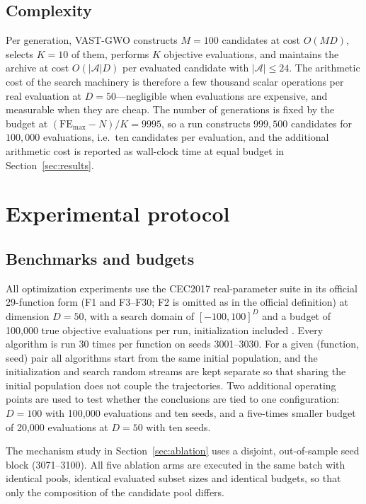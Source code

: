 \documentclass[11pt,a4paper]{article}
\newcommand{\method}{VAST-GWO}
\newcommand{\arc}{\mathcal{A}}
\begin{document}
\subsection{Complexity}
Per generation, \method{} constructs $M=100$ candidates at cost $O(MD)$,
selects $K=10$ of them, performs $K$ objective evaluations, and maintains the
archive at cost $O(|\arc|D)$ per evaluated candidate with $|\arc|\le 24$. The
arithmetic cost of the search machinery is therefore a few thousand scalar
operations per real evaluation at $D=50$---negligible when evaluations are
expensive, and measurable when they are cheap. The number of generations is
fixed by the budget at $(\mathrm{FE}_{\max}-N)/K=9995$, so a run constructs
$999{,}500$ candidates for $100{,}000$ evaluations, i.e.\ ten candidates per
evaluation, and the additional arithmetic cost is reported as wall-clock time
at equal budget in Section~\ref{sec:results}.
\section{Experimental protocol}
\label{sec:protocol}
\subsection{Benchmarks and budgets}
All optimization experiments use the CEC2017 real-parameter suite in its
official 29-function form (F1 and F3--F30; F2 is omitted as in the official
definition) at dimension $D=50$, with a search domain of $[-100,100]^D$ and a
budget of 100{,}000 true objective evaluations per run, initialization
included \citep{awad2016problem}. Every algorithm is run 30 times per function
on seeds 3001--3030. For a given (function, seed) pair all algorithms start
from the same initial population, and the initialization and search random
streams are kept separate so that sharing the initial population does not
couple the trajectories. Two additional operating points are used to test
whether the conclusions are tied to one configuration: $D=100$ with
100{,}000 evaluations and ten seeds, and a five-times smaller budget of
20{,}000 evaluations at $D=50$ with ten seeds.

The mechanism study in Section~\ref{sec:ablation} uses a disjoint,
out-of-sample seed block (3071--3100). All five ablation arms are executed in
the same batch with identical pools, identical evaluated subset sizes and
identical budgets, so that only the composition of the candidate pool differs.
\end{document}

